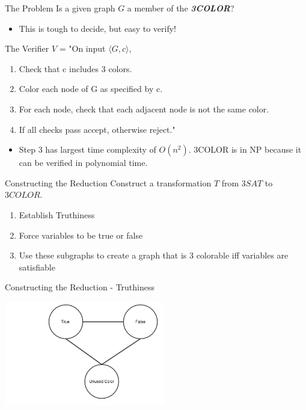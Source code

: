 \documentclass[bigger]{beamer}
\begin{document}
\begin{frame}[label=sec-4]{The Problem}
Is a given graph \(G\) a member of the \textbf{\textit{3COLOR}}?

\begin{itemize}
\item<2-> This is tough to decide, but easy to verify!
\end{itemize}
\end{frame}

\begin{frame}[label=sec-5]{The Verifier}
\(V\) = "On input \(\langle G, c \rangle\),
\begin{enumerate}
\item<1-> Check that c includes 3 colors.
\item<2-> Color each node of G as specified by c.
\item<3-> For each node, check that each adjacent node is not the same color.
\item<4-> If all checks pass accept, otherwise reject."
\end{enumerate}

\begin{itemize}
\item<5->Step 3 has largest time complexity of \(O(n^2)\). 3COLOR is in NP because it can be verified in polynomial time.
\end{itemize}
\end{frame}


\begin{frame}[label=sec-6]{Constructing the Reduction}
Construct a transformation \(T\) from \(3SAT\) to \(3COLOR\).
\begin{enumerate}
\item<2-> Establish Truthiness
\item<3-> Force variables to be true or false
\item<4-> Use these subgraphs to create a graph that is 3 colorable iff variables are satisfiable
\end{enumerate}
\end{frame}

\begin{frame}[label=sec-7]{Constructing the Reduction - Truthiness}
\begin{center}
\includegraphics[width=7cm]{Truthiness.png}
\end{center}
\end{frame}
\end{document}
